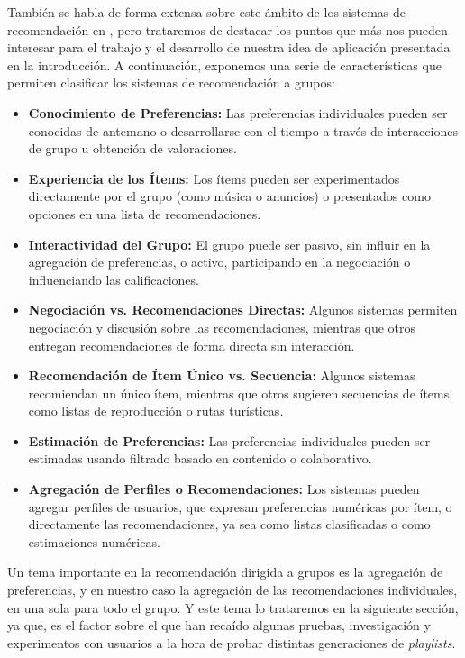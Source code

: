 También se habla de forma extensa sobre este ámbito de los sistemas de recomendación en \cite{grouprecommender}, pero trataremos de destacar los puntos
que más nos pueden interesar para el trabajo y el desarrollo de nuestra idea de aplicación presentada en la introducción. A continuación, exponemos
una serie de características que permiten clasificar los sistemas de recomendación a grupos:

\begin{itemize}
    \item \textbf{Conocimiento de Preferencias:} Las preferencias individuales pueden ser conocidas de antemano o desarrollarse con el tiempo a través 
    de interacciones de grupo u obtención de valoraciones.
    \item \textbf{Experiencia de los Ítems:} Los ítems pueden ser experimentados directamente por el grupo (como música o anuncios) o presentados como 
    opciones en una lista de recomendaciones.
    \item \textbf{Interactividad del Grupo:} El grupo puede ser pasivo, sin influir en la agregación de preferencias, o activo, participando en la 
    negociación o influenciando las calificaciones.
    \item \textbf{Negociación vs. Recomendaciones Directas:} Algunos sistemas permiten negociación y discusión sobre las recomendaciones, mientras que 
    otros entregan recomendaciones de forma directa sin interacción.
    \item \textbf{Recomendación de Ítem Único vs. Secuencia:} Algunos sistemas recomiendan un único ítem, mientras que otros sugieren secuencias de ítems,
     como listas de reproducción o rutas turísticas.
    \item \textbf{Estimación de Preferencias:} Las preferencias individuales pueden ser estimadas usando filtrado basado en contenido o colaborativo.
    \item \textbf{Agregación de Perfiles o Recomendaciones:} Los sistemas pueden agregar perfiles de usuarios, que expresan preferencias numéricas por ítem, 
    o directamente las recomendaciones, ya sea como listas clasificadas o como estimaciones numéricas.
\end{itemize}

Un tema importante en la recomendación dirigida a grupos es la agregación de preferencias, y en nuestro caso la agregación de las recomendaciones 
individuales, en una sola para todo el grupo. Y este tema lo trataremos en la siguiente sección, ya que, es el factor sobre el que han recaído 
algunas pruebas, investigación y experimentos con usuarios a la hora de probar distintas generaciones de \textit{playlists}.


